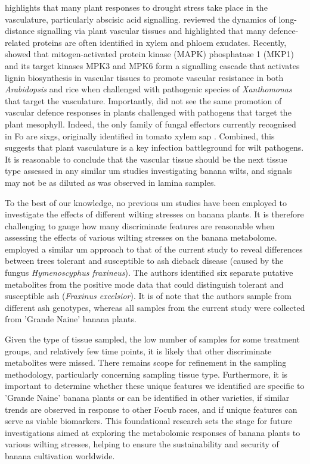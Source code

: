 \textcite{Takahashi2020} highlights that many plant responses to drought stress take place in the vasculature, particularly abscisic acid signalling. \textcite{Notaguchi2015} reviewed the dynamics of long-distance signalling via plant vascular tissues and highlighted that many defence-related proteins are often identified in xylem and phloem exudates. Recently, \textcite{Lin2022} showed that mitogen-activated protein kinase (MAPK) phosphatase 1 (MKP1) and its target kinases MPK3 and MPK6 form a signalling cascade that activates lignin biosynthesis in vascular tissues to promote vascular resistance in both \textit{Arabidopsis} and rice when challenged with pathogenic species of \textit{Xanthomonas} that target the vasculature. Importantly, \textcite{Lin2022} did not see the same promotion of vascular defence responses in plants challenged with pathogens that target the plant mesophyll. Indeed, the only family of fungal effectors currently recognised in \ac{Fo} are \acfp{sixg}, originally identified in tomato xylem sap \parencite{Houterman2007}. Combined, this suggests that plant vasculature is a key infection battleground for wilt pathogens. It is reasonable to conclude that the vascular tissue should be the next tissue type assessed in any similar \ac{um} studies investigating banana wilts, and signals may not be as diluted as was observed in lamina samples.  

\bigskip
\noindent
To the best of our knowledge, no previous \ac{um} studies have been employed to investigate the effects of different wilting stresses on banana plants. It is therefore challenging to gauge how many discriminate features are reasonable when assessing the effects of various wilting stresses on the banana metabolome. \textcite{Sambles2017} employed a similar \ac{um} approach to that of the current study to reveal differences between trees tolerant and susceptible to ash dieback disease (caused by the fungus \textit{Hymenoscyphus fraxineus}). The authors identified six separate putative metabolites from the positive mode data that could distinguish tolerant and susceptible ash (\textit{Fraxinus excelsior}). It is of note that the authors sample from different ash genotypes, whereas all samples from the current study were collected from 'Grande Naine' banana plants. 

Given the type of tissue sampled, the low number of samples for some treatment groups, and relatively few time points, it is likely that other discriminate metabolites were missed. There remains scope for refinement in the sampling methodology, particularly concerning sampling tissue type. Furthermore, it is important to determine whether these unique features we identified are specific to 'Grande Naine' banana plants or can be identified in other varieties, if similar trends are observed in response to other \ac{Focub} races, and if unique features can serve as viable biomarkers. This foundational research sets the stage for future investigations aimed at exploring the metabolomic responses of banana plants to various wilting stresses, helping to ensure the sustainability and security of banana cultivation worldwide. 

